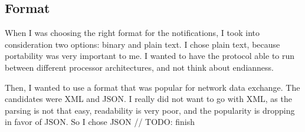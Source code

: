 \subsection{Format}\label{sec:protocol-format}

When I was choosing the right format
for the notifications,
I took into consideration two options:
binary and plain text.
I chose plain text,
because portability was very important to me.
I wanted to have the protocol able to run
between different processor architectures,
and not think about endianness.

Then, I wanted to use a format
that was popular for network data exchange.
The candidates were XML and JSON.
I really did not want to go with XML,
as the parsing is not that easy,
readability is very poor,
and the popularity is dropping
in favor of JSON.
So I chose JSON // TODO: finish
